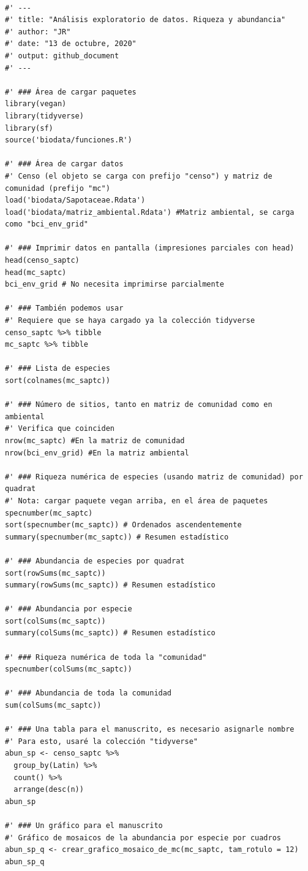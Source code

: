 \documentclass[11pt,]{article}
\begin{document}
\begin{verbatim}

#' ---
#' title: "Análisis exploratorio de datos. Riqueza y abundancia"
#' author: "JR"
#' date: "13 de octubre, 2020"
#' output: github_document
#' ---

#' ### Área de cargar paquetes
library(vegan)
library(tidyverse)
library(sf)
source('biodata/funciones.R')

#' ### Área de cargar datos
#' Censo (el objeto se carga con prefijo "censo") y matriz de comunidad (prefijo "mc")
load('biodata/Sapotaceae.Rdata')
load('biodata/matriz_ambiental.Rdata') #Matriz ambiental, se carga como "bci_env_grid"

#' ### Imprimir datos en pantalla (impresiones parciales con head)
head(censo_saptc)
head(mc_saptc)
bci_env_grid # No necesita imprimirse parcialmente

#' ### También podemos usar
#' Requiere que se haya cargado ya la colección tidyverse
censo_saptc %>% tibble
mc_saptc %>% tibble

#' ### Lista de especies
sort(colnames(mc_saptc))

#' ### Número de sitios, tanto en matriz de comunidad como en ambiental
#' Verifica que coinciden
nrow(mc_saptc) #En la matriz de comunidad
nrow(bci_env_grid) #En la matriz ambiental

#' ### Riqueza numérica de especies (usando matriz de comunidad) por quadrat
#' Nota: cargar paquete vegan arriba, en el área de paquetes
specnumber(mc_saptc)
sort(specnumber(mc_saptc)) # Ordenados ascendentemente
summary(specnumber(mc_saptc)) # Resumen estadístico

#' ### Abundancia de especies por quadrat
sort(rowSums(mc_saptc))
summary(rowSums(mc_saptc)) # Resumen estadístico

#' ### Abundancia por especie
sort(colSums(mc_saptc))
summary(colSums(mc_saptc)) # Resumen estadístico

#' ### Riqueza numérica de toda la "comunidad"
specnumber(colSums(mc_saptc))

#' ### Abundancia de toda la comunidad
sum(colSums(mc_saptc))

#' ### Una tabla para el manuscrito, es necesario asignarle nombre
#' Para esto, usaré la colección "tidyverse"
abun_sp <- censo_saptc %>%
  group_by(Latin) %>% 
  count() %>% 
  arrange(desc(n))
abun_sp

#' ### Un gráfico para el manuscrito
#' Gráfico de mosaicos de la abundancia por especie por cuadros
abun_sp_q <- crear_grafico_mosaico_de_mc(mc_saptc, tam_rotulo = 12)
abun_sp_q
\end{verbatim}
\end{document}
